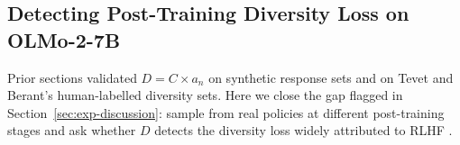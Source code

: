 %
%
%


\subsection{Detecting Post-Training Diversity Loss on OLMo-2-7B}\label{sec:rlhf-experiment}

Prior sections validated $D = C \times a_n$ on synthetic response sets and on Tevet and Berant's human-labelled diversity sets. Here we close the gap flagged in Section~\ref{sec:exp-discussion}: sample from real policies at different post-training stages and ask whether $D$ detects the diversity loss widely attributed to RLHF \citep{kirk2023rlhf,zhang2025verbalizedsampling,padmakumar2023writingreduces}.

